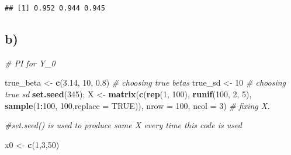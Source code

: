\documentclass[]{article}
\newenvironment{Shaded}{\begin{snugshade}}{\end{snugshade}}
\newcommand{\KeywordTok}[1]{\textcolor[rgb]{0.13,0.29,0.53}{\textbf{#1}}}
\newcommand{\DataTypeTok}[1]{\textcolor[rgb]{0.13,0.29,0.53}{#1}}
\newcommand{\DecValTok}[1]{\textcolor[rgb]{0.00,0.00,0.81}{#1}}
\newcommand{\FloatTok}[1]{\textcolor[rgb]{0.00,0.00,0.81}{#1}}
\newcommand{\StringTok}[1]{\textcolor[rgb]{0.31,0.60,0.02}{#1}}
\newcommand{\CommentTok}[1]{\textcolor[rgb]{0.56,0.35,0.01}{\textit{#1}}}
\newcommand{\OtherTok}[1]{\textcolor[rgb]{0.56,0.35,0.01}{#1}}
\newcommand{\OperatorTok}[1]{\textcolor[rgb]{0.81,0.36,0.00}{\textbf{#1}}}
\newcommand{\NormalTok}[1]{#1}
\begin{document}
\begin{verbatim}
## [1] 0.952 0.944 0.945
\end{verbatim}

\subsection{b)}\label{b-1}

\begin{Shaded}
\begin{Highlighting}[]
\CommentTok{# PI for Y_0}

\NormalTok{true_beta <-}\StringTok{ }\KeywordTok{c}\NormalTok{(}\FloatTok{3.14}\NormalTok{, }\DecValTok{10}\NormalTok{, }\FloatTok{0.8}\NormalTok{) }\CommentTok{# choosing true betas}
\NormalTok{true_sd <-}\StringTok{ }\DecValTok{10} \CommentTok{# choosing true sd}
\KeywordTok{set.seed}\NormalTok{(}\DecValTok{345}\NormalTok{); }
\NormalTok{X <-}\StringTok{ }\KeywordTok{matrix}\NormalTok{(}\KeywordTok{c}\NormalTok{(}\KeywordTok{rep}\NormalTok{(}\DecValTok{1}\NormalTok{, }\DecValTok{100}\NormalTok{), }\KeywordTok{runif}\NormalTok{(}\DecValTok{100}\NormalTok{, }\DecValTok{2}\NormalTok{, }\DecValTok{5}\NormalTok{), }
              \KeywordTok{sample}\NormalTok{(}\DecValTok{1}\OperatorTok{:}\DecValTok{100}\NormalTok{, }\DecValTok{100}\NormalTok{,}\DataTypeTok{replace =} \OtherTok{TRUE}\NormalTok{)), }\DataTypeTok{nrow =} \DecValTok{100}\NormalTok{, }\DataTypeTok{ncol =} \DecValTok{3}\NormalTok{) }\CommentTok{# fixing X. }

\CommentTok{#set.seed() is used to produce same X every time this code is used}

\NormalTok{x0 <-}\StringTok{ }\KeywordTok{c}\NormalTok{(}\DecValTok{1}\NormalTok{,}\DecValTok{3}\NormalTok{,}\DecValTok{50}\NormalTok{)}


\end{Highlighting}
\end{Shaded}
\end{document}
